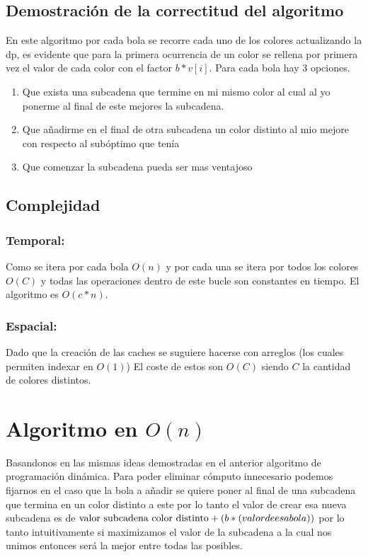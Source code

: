 \documentclass{article}
\begin{document}
\subsection{Demostración de la correctitud del algoritmo}
En este algoritmo por cada bola se recorre cada uno de los colores actualizando la dp, es evidente que para la primera
ocurrencia de un color se rellena por primera vez el valor de cada color con el factor $b*v[i]$.
Para cada bola hay 3 opciones.
\begin{enumerate}
    \item Que exista una subcadena que termine en mi mismo color al cual al yo ponerme al final de este mejores la subcadena.
    \item Que añadirme en el final de otra subcadena un color distinto al mio mejore con respecto al subóptimo que tenía
    \item Que comenzar la subcadena pueda ser mas ventajoso
\end{enumerate}


\subsection{Complejidad}
\subsubsection{Temporal:}
Como se itera por cada bola $O(n)$ y por cada una se itera por todos los colores $O(C)$ y todas las operaciones dentro
de este bucle son constantes en tiempo. El algoritmo es $O(c*n)$.

\subsubsection{Espacial:}
Dado que la creación de las caches se suguiere hacerse con arreglos (los cuales permiten indexar en $O(1)$) 
El coste de estos son $O(C)$ siendo $C$ la cantidad de colores distintos.

\section{Algoritmo en $O(n)$}
Basandonos en las mismas ideas demostradas en el anterior algoritmo de programación dinámica. 
Para poder eliminar cómputo innecesario podemos fijarnos en el caso que la bola a añadir se quiere poner al
final de una subcadena que termina en un color distinto a este por lo tanto el valor de crear esa nueva subcadena es de
$\text{valor subcadena color distinto}+(b*\text(valor de esa bola))$ por lo tanto intuitivamente si maximizamos el valor de la 
subcadena a la cual nos unimos entonces será la mejor entre todas las posibles.
\end{document}
